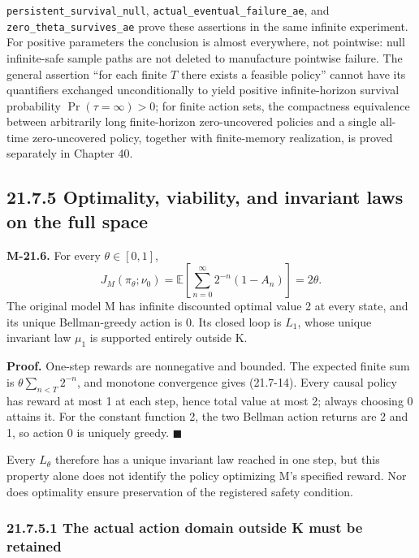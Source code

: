 \documentclass[
  english,
  11pt,
  oneside]{book}
\begin{document}
\nolinkurl{persistent_survival_null}, \nolinkurl{actual_eventual_failure_ae}, and \nolinkurl{zero_theta_survives_ae} prove these assertions in the same infinite experiment. For positive parameters the conclusion is almost everywhere, not pointwise: null infinite-safe sample paths are not deleted to manufacture pointwise failure. The general assertion ``for each finite \(T\) there exists a feasible policy'' cannot have its quantifiers exchanged unconditionally to yield positive infinite-horizon survival probability \(\Pr(\tau=\infty)>0\); for finite action sets, the compactness equivalence between arbitrarily long finite-horizon zero-uncovered policies and a single all-time zero-uncovered policy, together with finite-memory realization, is proved separately in Chapter 40.

\subsection{21.7.5 Optimality, viability, and invariant laws on the full space}\label{optimality-viability-and-invariant-laws-on-the-full-space}

\hypertarget{m-21-6}{}\label{m-21-6}

\textbf{M-21.6.} For every \(\theta\in[0,1]\), \[J_M(\pi_\theta;\nu_0)
=\mathbb E\!\left[\sum_{n=0}^\infty2^{-n}(1-A_n)\right]
=2\theta.                                          \tag{21.7-14}\] The original model M has infinite discounted optimal value 2 at every state, and its unique Bellman-greedy action is 0. Its closed loop is \(L_1\), whose unique invariant law \(\mu_1\) is supported entirely outside K.

\textbf{Proof.} One-step rewards are nonnegative and bounded. The expected finite sum is \(\theta\sum_{n<T}2^{-n}\), and monotone convergence gives (21.7-14). Every causal policy has reward at most 1 at each step, hence total value at most 2; always choosing 0 attains it. For the constant function 2, the two Bellman action returns are 2 and 1, so action 0 is uniquely greedy. \(\blacksquare\)

Every \(L_\theta\) therefore has a unique invariant law reached in one step, but this property alone does not identify the policy optimizing M's specified reward. Nor does optimality ensure preservation of the registered safety condition.

\subsubsection{21.7.5.1 The actual action domain outside K must be retained}\label{the-actual-action-domain-outside-k-must-be-retained}
\end{document}
